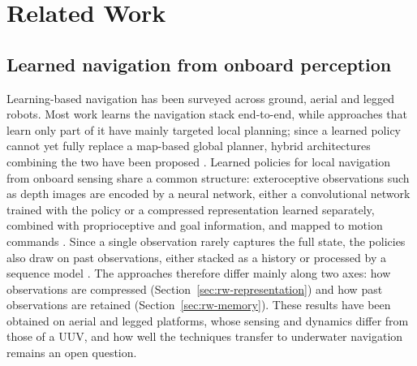 \section{Related Work}
\label{sec:related-work}
%
%
\subsection{Learned navigation from onboard perception}
\label{sec:rw-navigation}
Learning-based navigation has been surveyed across ground, aerial and legged robots.
Most work learns the navigation stack end-to-end, while approaches that learn only part
of it have mainly targeted local planning; since a learned policy cannot yet fully
replace a map-based global planner, hybrid architectures combining the two have been
proposed \parencite{xiao2022motion}. Learned policies for local navigation from onboard
sensing share a common structure: exteroceptive observations such as depth images are
encoded by a neural network, either a convolutional network trained with the policy or a
compressed representation learned separately, combined with proprioceptive and goal
information, and mapped to motion commands \parencite{almahamid2022autonomous,
ha2025learning}. Since a single observation rarely captures the full state, the policies
also draw on past observations, either stacked as a history or processed by a sequence
model \parencite{ha2025learning, almahamid2022autonomous}. The approaches therefore differ
mainly along two axes: how observations are compressed (Section~\ref{sec:rw-representation}) and how past observations are retained (Section~\ref{sec:rw-memory}). These results have been obtained on aerial and legged
platforms, whose sensing and dynamics differ from those of a UUV, and how well the
techniques transfer to underwater navigation remains an open question.

